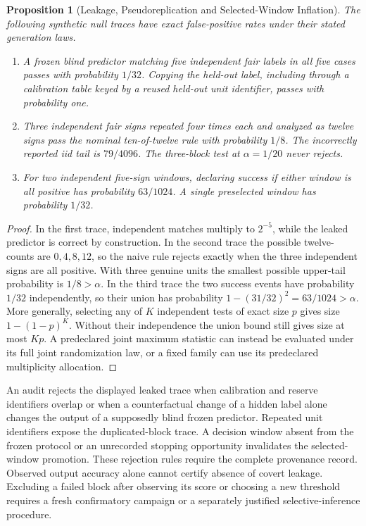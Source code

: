 \documentclass[11pt,a4paper]{article}
\newtheorem{proposition}[theorem]{Proposition}
\theoremstyle{definition}
\begin{document}
\begin{proposition}[Leakage, Pseudoreplication and Selected-Window Inflation]\label{prop:campaign-pathology-inflation}
The following synthetic null traces have exact false-positive rates under their stated generation laws.
\begin{enumerate}
\item A frozen blind predictor matching five independent fair labels in all five cases passes with probability $1/32$. Copying the held-out label, including through a calibration table keyed by a reused held-out unit identifier, passes with probability one.
\item Three independent fair signs repeated four times each and analyzed as twelve signs pass the nominal ten-of-twelve rule with probability $1/8$. The incorrectly reported iid tail is $79/4096$. The three-block test at $\alpha=1/20$ never rejects.
\item For two independent five-sign windows, declaring success if either window is all positive has probability $63/1024$. A single preselected window has probability $1/32$.
\end{enumerate}
\end{proposition}
\begin{proof}
In the first trace, independent matches multiply to $2^{-5}$, while the leaked predictor is correct by construction. In the second trace the possible twelve-counts are $0,4,8,12$, so the naive rule rejects exactly when the three independent signs are all positive. With three genuine units the smallest possible upper-tail probability is $1/8>\alpha$. In the third trace the two success events have probability $1/32$ independently, so their union has probability $1-(31/32)^2=63/1024>\alpha$. More generally, selecting any of $K$ independent tests of exact size $p$ gives size $1-(1-p)^K$. Without their independence the union bound still gives size at most $Kp$. A predeclared joint maximum statistic can instead be evaluated under its full joint randomization law, or a fixed family can use its predeclared multiplicity allocation.
\end{proof}

An audit rejects the displayed leaked trace when calibration and reserve identifiers overlap or when a counterfactual change of a hidden label alone changes the output of a supposedly blind frozen predictor. Repeated unit identifiers expose the duplicated-block trace. A decision window absent from the frozen protocol or an unrecorded stopping opportunity invalidates the selected-window promotion. These rejection rules require the complete provenance record. Observed output accuracy alone cannot certify absence of covert leakage. Excluding a failed block after observing its score or choosing a new threshold requires a fresh confirmatory campaign or a separately justified selective-inference procedure.
\end{document}
